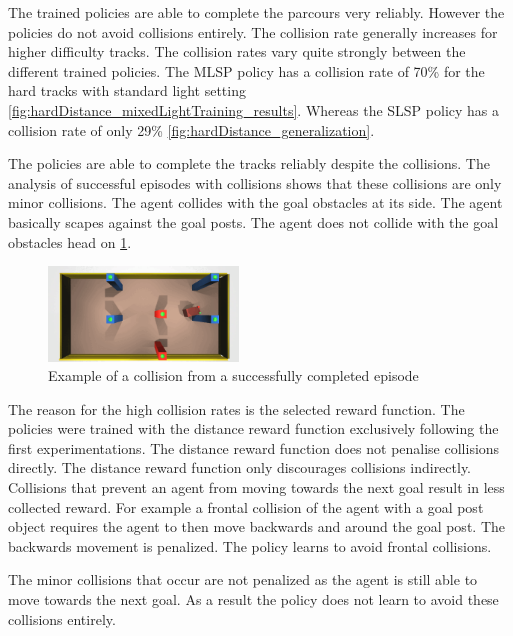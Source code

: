 The trained policies are able to complete the parcours very reliably. However the policies do not avoid collisions entirely. The collision rate generally increases for higher difficulty tracks. The collision rates vary quite strongly between the different trained policies. The \acs{MLSP} policy has a collision rate of 70\% for the hard tracks with standard light setting \ref{fig:hardDistance_mixedLightTraining_results}. Whereas the \acs{SLSP} policy has a collision rate of only 29\% \ref{fig:hardDistance_generalization}.

The policies are able to complete the tracks reliably despite the collisions. The analysis of successful episodes with collisions shows that these collisions are only minor collisions. The agent collides with the goal obstacles at its side. The agent basically scapes against the goal posts. The agent does not collide with the goal obstacles head on \ref{fig:example_collision_success}.

\begin{figure}
    \centering
    \includegraphics[width=0.45\textwidth]{Bilder/example_minor_collision_topview_frame_1295.png}
    \caption{Example of a collision from a successfully completed episode}
    \label{fig:example_collision_success}
\end{figure}

The reason for the high collision rates is the selected reward function. The policies were trained with the distance reward function exclusively following the first experimentations. The distance reward function does not penalise collisions directly. The distance reward function only discourages collisions indirectly. Collisions that prevent an agent from moving towards the next goal result in less collected reward. For example a frontal collision of the agent with a goal post object requires the agent to then move backwards and around the goal post. The backwards movement is penalized. The policy learns to avoid frontal collisions.

The minor collisions that occur are not penalized as the agent is still able to move towards the next goal. As a result the policy does not learn to avoid these collisions entirely.



